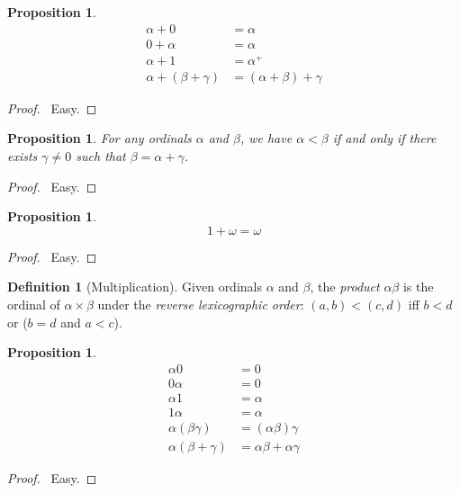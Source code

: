 \documentclass{report}
\let\qed\relax
\newtheorem{prop}[ax]{Proposition}
\theoremstyle{definition}
\newtheorem{df}[ax]{Definition}
\begin{document}
\begin{prop}
\begin{align*}
\alpha + 0 & = \alpha \\
0 + \alpha & = \alpha \\
\alpha + 1 & = \alpha^+ \\
\alpha + (\beta + \gamma) & = (\alpha + \beta) + \gamma
\end{align*}
\end{prop}

\begin{proof}
\pf\ Easy. \qed
\end{proof}

\begin{prop}
For any ordinals $\alpha$ and $\beta$, we have $\alpha < \beta$ if and only if there exists $\gamma \neq 0$ such that $\beta = \alpha + \gamma$.
\end{prop}

\begin{proof}
\pf\ Easy. \qed
\end{proof}

\begin{prop}
\[ 1 + \omega = \omega \]
\end{prop}

\begin{proof}
\pf\ Easy. \qed
\end{proof}

\begin{df}[Multiplication]
Given ordinals $\alpha$ and $\beta$, the \emph{product} $\alpha \beta$ is the ordinal of $\alpha \times \beta$ under the \emph{reverse lexicographic order}: $(a,b) < (c,d)$ iff $b < d$ or ($b = d$ and $a < c$).
\end{df}

\begin{prop}
\begin{align*}
\alpha 0 & = 0 \\
0 \alpha & = 0 \\
\alpha 1 & = \alpha \\
1 \alpha & = \alpha \\
\alpha (\beta \gamma) & = (\alpha \beta) \gamma \\
\alpha (\beta + \gamma) & = \alpha \beta + \alpha \gamma
\end{align*}
\end{prop}

\begin{proof}
\pf\ Easy. \qed
\end{proof}
\end{document}
